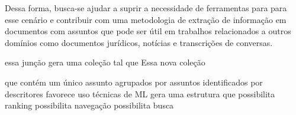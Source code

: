 Dessa forma, busca-se ajudar a suprir a necessidade de ferramentas para para esse cenário e contribuir com uma metodologia de extração de informação em documentos com assuntos que pode ser útil em trabalhos relacionados a outros domínios como documentos jurídicos, notícias e transcrições de conversas.










essa junção gera uma coleção tal que 
Essa nova coleção 

  que contém um único assunto 
  agrupados por assuntos 
  identificados por descritores
  favorece uso técnicas de ML
  gera uma estrutura que 
    possibilita ranking
	possibilita navegação
	possibilita busca
  


